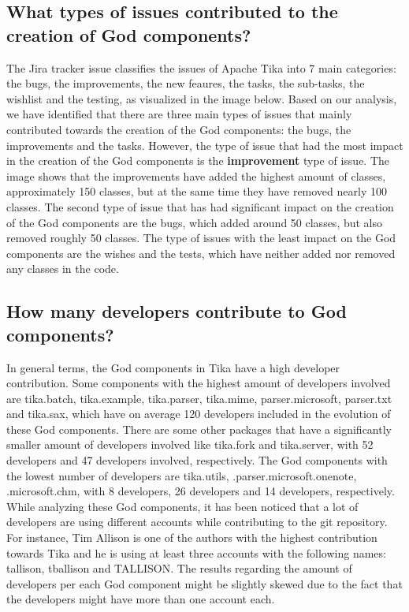 \documentclass{article}
\begin{document}


\subsection{What types of issues contributed to the creation of God components?}
 The Jira tracker issue classifies the issues of Apache Tika into 7 main categories: the bugs, the improvements, the new feaures, the tasks, the sub-tasks, the wishlist and the testing, as visualized in the image below. Based on our analysis, we have identified that there are three main types of issues that mainly contributed towards the creation of the God components: the bugs, the improvements and the tasks. However, the type of issue that had the most impact in the creation of the God components is the \textbf{improvement} type of issue. The image shows that the improvements have added the highest amount of classes, approximately 150 classes, but at the same time they have removed nearly 100 classes. The second type of issue that has had significant impact on the creation of the God components are the bugs, which added around 50 classes, but also removed roughly 50 classes. The type of issues with the least impact on the God components are the wishes and the tests, which have neither added nor removed any classes in the code. 

\subsection{How many developers contribute to God components?}
In general terms, the God components in Tika have a high developer contribution. Some components with the highest amount of developers involved are tika.batch, tika.example, tika.parser, tika.mime, parser.microsoft, parser.txt and tika.sax, which have on average 120 developers included in the evolution of these God components. There are some other packages that have a significantly smaller amount of developers involved like tika.fork and tika.server, with 52 developers and 47 developers involved, respectively. The God components with the lowest number of developers are tika.utils, .parser.microsoft.onenote, .microsoft.chm, with 8 developers, 26 developers and 14 developers, respectively.\\
While analyzing these God components, it has been noticed that a lot of developers are using different accounts while contributing to the git repository. For instance, Tim Allison is one of the authors with the highest contribution towards Tika and he is using at least three accounts with the following names: tallison, tballison and TALLISON. The results regarding the amount of developers per each God component might be slightly skewed due to the fact that the developers might have more than one account each. 
\end{document}
